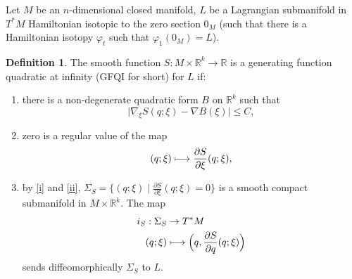 \documentclass[JEP,XML,SOM,NoFloatCountersInSection,Unicode,published]{cedram}
\newcommand\mto{\mathchoice{\longmapsto}{\mapsto}{\mapsto}{\mapsto}}
\numberwithin{equation}{section}
\newcommand{\GFQI}{\textup{GFQI}\xspace}
\theoremstyle{plain}
\theoremstyle{definition}
\newtheorem{definition}[theorem]{Definition}
\theoremstyle{remark}
\begin{document}
\label{sec-3.1}
Let $M$
be an $n$-dimensional closed manifold, $L$ be a Lagrangian submanifold in $T^{*}M$
Hamiltonian isotopic to the
zero section $0_{M}$ (\ie such that there is a Hamiltonian isotopy
$\varphi_{t}$ such that $\varphi_{1}(0_{M})=L$).

\begin{definition}\label{Def-3.1} The smooth function $S:M\times
\mathbb{R}^{k}\to \mathbb{R}$ is a generating function quadratic at
infinity (\GFQI for short) for $L$ if:

\begin{enumerate} \item \label{i} there is a non-degenerate quadratic form $B$ on $\mathbb{R}^{k}$
such that
\[
\vert \nabla_{\xi}S(q;\xi) - \nabla B (\xi) \vert \leq C,
\]

\item \label{ii} zero is a regular value of the map
\[
(q;\xi) \mto \frac{\partial S}{\partial \xi} (q;\xi),
\]

\item \label{iii} by \eqref{i} and \eqref{ii}, $\Sigma_{S}= \{ (q;\xi) \mid \frac{\partial S}{\partial \xi} (q;\xi)=0\}$ is a smooth compact submanifold in $M\times
\mathbb{R}^{k}$. The map
\begin{align*}
i_{S}: \Sigma_{S} &\to T^{*}M\\
(q;\xi) &\mto \Bigl(q, \frac{\partial S}{\partial q} (q;\xi)\Bigr)
\end{align*}
sends diffeomorphically $\Sigma_{S}$ to $L$.
\end{enumerate}
\end{definition}
\end{document}
